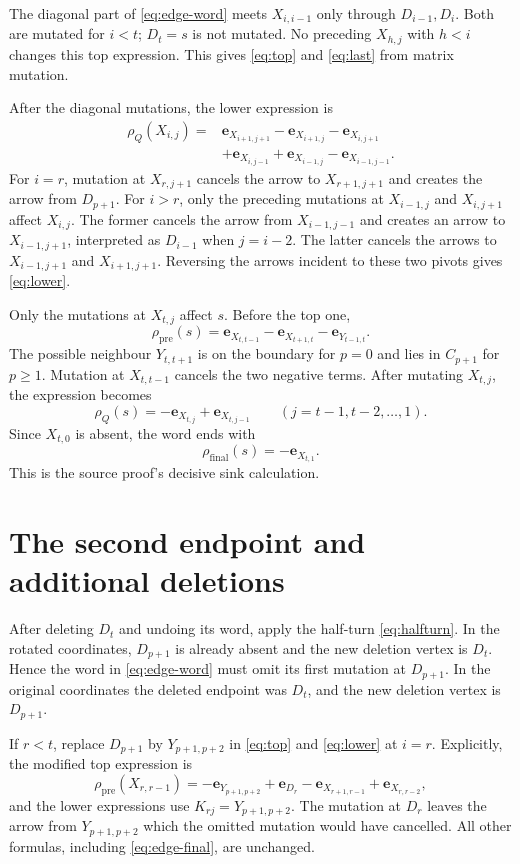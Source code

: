 \documentclass[11pt,a4paper]{article}
\newcommand{\e}{\mathbf e}
\begin{document}
The diagonal part of \eqref{eq:edge-word} meets $X_{i,i-1}$ only through
$D_{i-1},D_i$. Both are mutated for $i<t$; $D_t=s$ is not mutated.
No preceding $X_{h,j}$ with $h<i$ changes this top expression.
This gives \eqref{eq:top} and \eqref{eq:last} from matrix mutation.

After the diagonal mutations, the lower expression is
\[
 \begin{split}
 \rho_Q(X_{i,j})={}&\e_{X_{i+1,j+1}}-\e_{X_{i+1,j}}-\e_{X_{i,j+1}}\\
 &+\e_{X_{i,j-1}}+\e_{X_{i-1,j}}-\e_{X_{i-1,j-1}}.
 \end{split}
\]
For $i=r$, mutation at $X_{r,j+1}$ cancels the arrow to $X_{r+1,j+1}$
and creates the arrow from $D_{p+1}$.
For $i>r$, only the preceding mutations at $X_{i-1,j}$ and $X_{i,j+1}$
affect $X_{i,j}$. The former cancels the arrow from $X_{i-1,j-1}$
and creates an arrow to $X_{i-1,j+1}$, interpreted as $D_{i-1}$ when
$j=i-2$. The latter cancels the arrows to $X_{i-1,j+1}$ and $X_{i+1,j+1}$.
Reversing the arrows incident to these two pivots gives \eqref{eq:lower}.

Only the mutations at $X_{t,j}$ affect $s$. Before the top one,
\[
 \rho_{\mathrm{pre}}(s)=\e_{X_{t,t-1}}-\e_{X_{t+1,t}}-\e_{Y_{t-1,t}}.
\]
The possible neighbour $Y_{t,t+1}$ is on the boundary for $p=0$ and lies
in $C_{p+1}$ for $p\ge1$. Mutation at $X_{t,t-1}$ cancels the two negative
terms. After mutating $X_{t,j}$, the expression becomes
\[
 \rho_Q(s)=-\e_{X_{t,j}}+\e_{X_{t,j-1}}
 \qquad(j=t-1,t-2,\ldots,1).
\]
Since $X_{t,0}$ is absent, the word ends with
\begin{equation}\label{eq:edge-final}
 \rho_{\mathrm{final}}(s)=-\e_{X_{t,1}}.
\end{equation}
This is the source proof's decisive sink calculation.

\newpage
\section{The second endpoint and additional deletions}
After deleting $D_t$ and undoing its word, apply the half-turn
\eqref{eq:halfturn}. In the rotated coordinates, $D_{p+1}$ is already
absent and the new deletion vertex is $D_t$. Hence the word in
\eqref{eq:edge-word} must omit its first mutation at $D_{p+1}$.
In the original coordinates the deleted endpoint was $D_t$, and the
new deletion vertex is $D_{p+1}$.

If $r<t$, replace $D_{p+1}$ by $Y_{p+1,p+2}$ in \eqref{eq:top}
and \eqref{eq:lower} at $i=r$. Explicitly, the modified top expression is
\[
 \rho_{\mathrm{pre}}(X_{r,r-1})
 =-\e_{Y_{p+1,p+2}}+\e_{D_r}
   -\e_{X_{r+1,r-1}}+\e_{X_{r,r-2}},
\]
and the lower expressions use $K_{rj}=Y_{p+1,p+2}$.
The mutation at $D_r$ leaves the arrow from $Y_{p+1,p+2}$ which the
omitted mutation would have cancelled. All other formulas, including
\eqref{eq:edge-final}, are unchanged.
\end{document}
